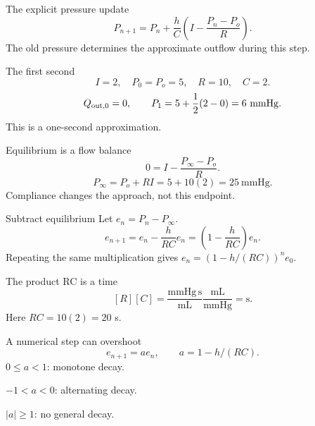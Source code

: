 \documentclass[aspectratio=169,11pt]{beamer}
\newcommand{\notestarget}{notes.pdf}\newcommand{\noteslabel}{Notes}
\begin{document}
\renewcommand{\notestarget}{notes.pdf\#note-combine-storage-with-a-volume-balance}
\begin{frame}[t,fragile,label=slide-the-explicit-pressure-update]{The explicit pressure update}
\[P_{n+1}=P_n+\frac hC\left(I-\frac{P_n-P_o}{R}\right).\]\pause{} The old pressure determines the approximate outflow during this step.
\end{frame}
\renewcommand{\notestarget}{notes.pdf\#note-combine-storage-with-a-volume-balance}
\begin{frame}[t,fragile,label=slide-the-first-second]{The first second}
\[I=2,\quad P_0=P_o=5,\quad R=10,\quad C=2.\]\pause{}\[Q_{{\rm out},0}=0,\qquad P_1=5+\frac12(2-0)=6\ \mathrm{mmHg}.\]\pause{} This is a one-second approximation.
\end{frame}
\renewcommand{\notestarget}{notes.pdf\#note-equilibrium-and-the-error-recurrence}
\begin{frame}[t,fragile,label=slide-equilibrium-is-a-flow-balance]{Equilibrium is a flow balance}
\[0=I-\frac{P_\infty-P_o}{R}.\]\pause{}\[P_\infty=P_o+RI=5+10(2)=25\ \mathrm{mmHg}.\]\pause{} Compliance changes the approach, not this endpoint.
\end{frame}
\renewcommand{\notestarget}{notes.pdf\#note-equilibrium-and-the-error-recurrence}
\begin{frame}[t,fragile,label=slide-subtract-equilibrium]{Subtract equilibrium}
Let $e_n=P_n-P_\infty$.\pause{}\[e_{n+1}=e_n-\frac h{RC}e_n=\left(1-\frac h{RC}\right)e_n.\]\pause{} Repeating the same multiplication gives $e_n=(1-h/(RC))^ne_0$.
\end{frame}
\renewcommand{\notestarget}{notes.pdf\#note-equilibrium-and-the-error-recurrence}
\begin{frame}[t,fragile,label=slide-the-product-rc-is-a-time]{The product RC is a time}
\[[R][C]=\frac{\mathrm{mmHg\,s}}{\mathrm{mL}}\frac{\mathrm{mL}}{\mathrm{mmHg}}=\mathrm s.\]\pause{} Here $RC=10(2)=20$ s.
\end{frame}
\renewcommand{\notestarget}{notes.pdf\#note-equilibrium-and-the-error-recurrence}
\begin{frame}[t,fragile,label=slide-a-numerical-step-can-overshoot]{A numerical step can overshoot}
\[e_{n+1}=a e_n,\qquad a=1-h/(RC).\]\pause{} $0\le a<1$: monotone decay.\pause{}\par $-1<a<0$: alternating decay.\pause{}\par $|a|\ge1$: no general decay.
\end{frame}
\renewcommand{\notestarget}{notes.pdf\#note-the-exponential-response}
\end{document}
